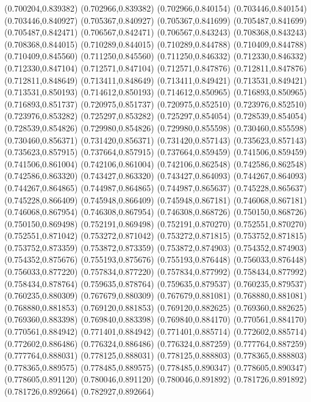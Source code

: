 (0.700204,0.839382)
(0.702966,0.839382)
(0.702966,0.840154)
(0.703446,0.840154)
(0.703446,0.840927)
(0.705367,0.840927)
(0.705367,0.841699)
(0.705487,0.841699)
(0.705487,0.842471)
(0.706567,0.842471)
(0.706567,0.843243)
(0.708368,0.843243)
(0.708368,0.844015)
(0.710289,0.844015)
(0.710289,0.844788)
(0.710409,0.844788)
(0.710409,0.845560)
(0.711250,0.845560)
(0.711250,0.846332)
(0.712330,0.846332)
(0.712330,0.847104)
(0.712571,0.847104)
(0.712571,0.847876)
(0.712811,0.847876)
(0.712811,0.848649)
(0.713411,0.848649)
(0.713411,0.849421)
(0.713531,0.849421)
(0.713531,0.850193)
(0.714612,0.850193)
(0.714612,0.850965)
(0.716893,0.850965)
(0.716893,0.851737)
(0.720975,0.851737)
(0.720975,0.852510)
(0.723976,0.852510)
(0.723976,0.853282)
(0.725297,0.853282)
(0.725297,0.854054)
(0.728539,0.854054)
(0.728539,0.854826)
(0.729980,0.854826)
(0.729980,0.855598)
(0.730460,0.855598)
(0.730460,0.856371)
(0.731420,0.856371)
(0.731420,0.857143)
(0.735623,0.857143)
(0.735623,0.857915)
(0.737664,0.857915)
(0.737664,0.859459)
(0.741506,0.859459)
(0.741506,0.861004)
(0.742106,0.861004)
(0.742106,0.862548)
(0.742586,0.862548)
(0.742586,0.863320)
(0.743427,0.863320)
(0.743427,0.864093)
(0.744267,0.864093)
(0.744267,0.864865)
(0.744987,0.864865)
(0.744987,0.865637)
(0.745228,0.865637)
(0.745228,0.866409)
(0.745948,0.866409)
(0.745948,0.867181)
(0.746068,0.867181)
(0.746068,0.867954)
(0.746308,0.867954)
(0.746308,0.868726)
(0.750150,0.868726)
(0.750150,0.869498)
(0.752191,0.869498)
(0.752191,0.870270)
(0.752551,0.870270)
(0.752551,0.871042)
(0.753272,0.871042)
(0.753272,0.871815)
(0.753752,0.871815)
(0.753752,0.873359)
(0.753872,0.873359)
(0.753872,0.874903)
(0.754352,0.874903)
(0.754352,0.875676)
(0.755193,0.875676)
(0.755193,0.876448)
(0.756033,0.876448)
(0.756033,0.877220)
(0.757834,0.877220)
(0.757834,0.877992)
(0.758434,0.877992)
(0.758434,0.878764)
(0.759635,0.878764)
(0.759635,0.879537)
(0.760235,0.879537)
(0.760235,0.880309)
(0.767679,0.880309)
(0.767679,0.881081)
(0.768880,0.881081)
(0.768880,0.881853)
(0.769120,0.881853)
(0.769120,0.882625)
(0.769360,0.882625)
(0.769360,0.883398)
(0.769840,0.883398)
(0.769840,0.884170)
(0.770561,0.884170)
(0.770561,0.884942)
(0.771401,0.884942)
(0.771401,0.885714)
(0.772602,0.885714)
(0.772602,0.886486)
(0.776324,0.886486)
(0.776324,0.887259)
(0.777764,0.887259)
(0.777764,0.888031)
(0.778125,0.888031)
(0.778125,0.888803)
(0.778365,0.888803)
(0.778365,0.889575)
(0.778485,0.889575)
(0.778485,0.890347)
(0.778605,0.890347)
(0.778605,0.891120)
(0.780046,0.891120)
(0.780046,0.891892)
(0.781726,0.891892)
(0.781726,0.892664)
(0.782927,0.892664)
